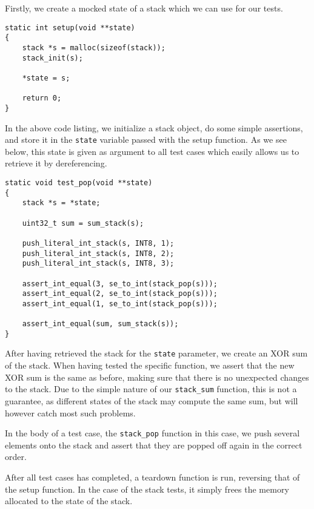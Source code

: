 Firstly, we create a mocked state of a stack which we can use for our tests.

\begin{minipage}{\linewidth}
\begin{lstlisting}[language={[ANSI]C},caption={Unit-test setup procedure}]
static int setup(void **state)
{
    stack *s = malloc(sizeof(stack));
    stack_init(s);

    *state = s;

    return 0;
}
\end{lstlisting}
\end{minipage}

In the above code listing, we initialize a stack object, do some simple
assertions, and store it in the {\tt state} variable passed with the setup
function. As we see below, this state is given as argument to all test cases
which easily allows us to retrieve it by dereferencing.

\begin{minipage}{\linewidth}
\begin{lstlisting}[language={[ANSI]C},caption={Unit-test of {\tt stack\_pop}}]
static void test_pop(void **state)
{
    stack *s = *state;

    uint32_t sum = sum_stack(s);

    push_literal_int_stack(s, INT8, 1);
    push_literal_int_stack(s, INT8, 2);
    push_literal_int_stack(s, INT8, 3);

    assert_int_equal(3, se_to_int(stack_pop(s)));
    assert_int_equal(2, se_to_int(stack_pop(s)));
    assert_int_equal(1, se_to_int(stack_pop(s)));

    assert_int_equal(sum, sum_stack(s));
}
\end{lstlisting}
\end{minipage}

After having retrieved the stack for the {\tt state} parameter, we create an XOR
sum of the stack. When having tested the specific function, we assert that the
new XOR sum is the same as before, making sure that there is no unexpected
changes to the stack. Due to the simple nature of our {\tt stack\_sum} function,
this is not a guarantee, as different states of the stack may compute the same
sum, but will however catch most such problems.

In the body of a test case, the {\tt stack\_pop} function in this case, we push
several elements onto the stack and assert that they are popped off again in the
correct order.

After all test cases has completed, a teardown function is run, reversing that
of the setup function. In the case of the stack tests, it simply frees the
memory allocated to the state of the stack.

